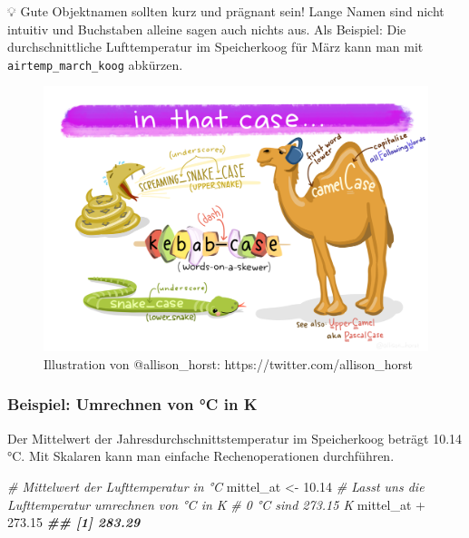 \documentclass[
]{article}
\newenvironment{Shaded}{\begin{snugshade}}{\end{snugshade}}
\newcommand{\CommentTok}[1]{\textcolor[rgb]{0.56,0.35,0.01}{\textit{#1}}}
\newcommand{\DocumentationTok}[1]{\textcolor[rgb]{0.56,0.35,0.01}{\textbf{\textit{#1}}}}
\newcommand{\FloatTok}[1]{\textcolor[rgb]{0.00,0.00,0.81}{#1}}
\newcommand{\NormalTok}[1]{#1}
\newcommand{\OtherTok}[1]{\textcolor[rgb]{0.56,0.35,0.01}{#1}}
\newcommand{\SpecialCharTok}[1]{\textcolor[rgb]{0.00,0.00,0.00}{#1}}
\begin{document}
💡 Gute Objektnamen sollten kurz und prägnant sein! Lange Namen sind nicht intuitiv und Buchstaben alleine sagen auch nichts aus. Als Beispiel: Die durchschnittliche Lufttemperatur im Speicherkoog für März kann man mit \texttt{airtemp\_march\_koog} abkürzen.

\begin{figure}

{\centering \includegraphics[width=55.57in]{images/016} 

}

\caption{Illustration von @allison_horst: https://twitter.com/allison_horst}\label{fig:unnamed-chunk-32}
\end{figure}

\hypertarget{beispiel-umrechnen-von-c-in-k}{%
\subsubsection{Beispiel: Umrechnen von °C in K}\label{beispiel-umrechnen-von-c-in-k}}

Der Mittelwert der Jahresdurchschnittstemperatur im Speicherkoog beträgt 10.14 °C. Mit Skalaren kann man einfache Rechenoperationen durchführen.

\begin{Shaded}
\begin{Highlighting}[]
\CommentTok{\# Mittelwert der Lufttemperatur in °C}
\NormalTok{mittel\_at }\OtherTok{\textless{}{-}} \FloatTok{10.14}
\CommentTok{\# Lasst uns die Lufttemperatur umrechnen von °C in K}
\CommentTok{\# 0 °C sind 273.15 K}
\NormalTok{mittel\_at }\SpecialCharTok{+} \FloatTok{273.15}
\DocumentationTok{\#\# [1] 283.29}
\end{Highlighting}
\end{Shaded}
\end{document}
